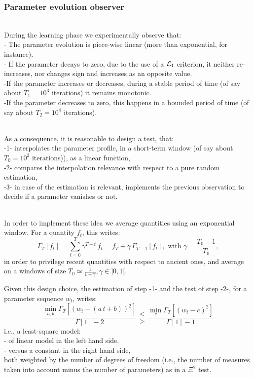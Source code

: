 \documentclass{article}\usepackage[width=17cm,height=22cm]{geometry}\usepackage[english]{babel} \usepackage[utf8]{inputenc}\usepackage{fancyvrb} \usepackage{authblk} \usepackage{hyperref}\usepackage{outlines} \usepackage{graphicx} \usepackage{color}\DeclareGraphicsExtensions{.pdf,.png,.jpg}\definecolor{vthierry}{RGB}{80,0,120}\newcommand{\vthierry}[1]{{\color{vthierry}{#1}}}\definecolor{thalita}{RGB}{51, 153, 255}\newcommand{\thalita}[1]{{\color{thalita}{#1}}}
\begin{document}
\subsubsection*{Parameter evolution observer}

~\\

During the learning phase we experimentally observe that:
\\- The parameter evolution is piece-wise linear (more than exponential, for instance). 
\\- If the parameter decays to zero, due to the use of a ${\cal L}_1$ criterion, it neither re-increases, nor changes sign and increases as an opposite value. 
\\ -If the parameter increases or decreases, during a stable period of time (of say about $T_1=10^3$ iterations) it remains monotonic.
\\ -If the parameter decreases to zero, this happens in a bounded period of time (of say about $T_2=10^4$ iterations).

~\\

As a consequence, it is reasonable to design a test, that:
\\ -1- interpolates the parameter profile, in a short-term window (of say about $T_0=10^2$ iterations)), as a linear function, 
\\ -2- compares the interpolation relevance with respect to a pure random estimation,
\\ -3- in case of the estimation is relevant, implements the previous observation to decide if a parameter vanishes or not.

~\\

In order to implement these idea we average quantities using an exponential window. For a quantity $f_t$, this writes:
\[ \Gamma_T[f_t] = \sum_{t = 0}^T \gamma^{T-t} \, f_t = f_T + \gamma \, \Gamma_{T-1}[f_t], \mbox{ with } \gamma = \frac{T_0 - 1}{T_0}, \]
in order to privilege recent quantities with respect to ancient ones, and average on a windows of size $T_0 \simeq \frac{1}{1-\gamma}, \gamma \in ]0, 1[$.

Given this design choice, the estimation of step -1- and the test of step -2-, for a parameter sequence $w_t$, writes:
\[
   \frac{\min_{a, b} \Gamma_T\left[ (w_t - (a \, t + b ))^2 \right]}{\Gamma[1] - 2}
   \begin{array}{c}<\\>\end{array}
   \frac{\min_{c} \Gamma_T\left[ (w_t - c)^2 \right]}{\Gamma[1] - 1}
\]
i.e., a least-square model:
\\ - of linear model in the left hand side, 
\\ - versus a constant in the right hand side,
\\ both weighted by the number of degrees of freedom (i.e., the number of measures taken into account minus the number of parameters) as in a $\Xi^2$ test.
\end{document}
